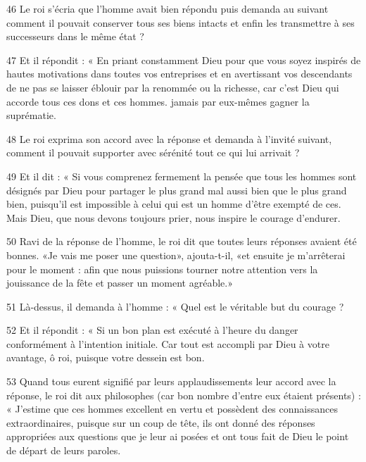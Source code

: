 \par 46 Le roi s'écria que l'homme avait bien répondu puis demanda au suivant comment il pouvait conserver tous ses biens intacts et enfin les transmettre à ses successeurs dans le même état ?

\par 47 Et il répondit : « En priant constamment Dieu pour que vous soyez inspirés de hautes motivations dans toutes vos entreprises et en avertissant vos descendants de ne pas se laisser éblouir par la renommée ou la richesse, car c'est Dieu qui accorde tous ces dons et ces hommes. jamais par eux-mêmes gagner la suprématie.

\par 48 Le roi exprima son accord avec la réponse et demanda à l'invité suivant, comment il pouvait supporter avec sérénité tout ce qui lui arrivait ?

\par 49 Et il dit : « Si vous comprenez fermement la pensée que tous les hommes sont désignés par Dieu pour partager le plus grand mal aussi bien que le plus grand bien, puisqu'il est impossible à celui qui est un homme d'être exempté de ces. Mais Dieu, que nous devons toujours prier, nous inspire le courage d'endurer.

\par 50 Ravi de la réponse de l'homme, le roi dit que toutes leurs réponses avaient été bonnes. «Je vais me poser une question», ajouta-t-il, «et ensuite je m'arrêterai pour le moment : afin que nous puissions tourner notre attention vers la jouissance de la fête et passer un moment agréable.»

\par 51 Là-dessus, il demanda à l'homme : « Quel est le véritable but du courage ?

\par 52 Et il répondit : « Si un bon plan est exécuté à l'heure du danger conformément à l'intention initiale. Car tout est accompli par Dieu à votre avantage, ô roi, puisque votre dessein est bon.

\par 53 Quand tous eurent signifié par leurs applaudissements leur accord avec la réponse, le roi dit aux philosophes (car bon nombre d'entre eux étaient présents) : « J'estime que ces hommes excellent en vertu et possèdent des connaissances extraordinaires, puisque sur un coup de tête, ils ont donné des réponses appropriées aux questions que je leur ai posées et ont tous fait de Dieu le point de départ de leurs paroles.

